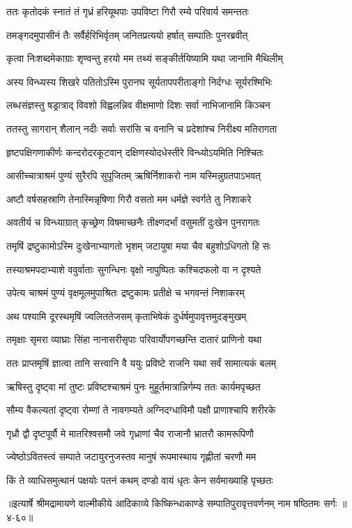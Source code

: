 
\twolineshloka
{ततः कृतोदकं स्नातं तं गृध्रं हरियूथपाः}
{उपविष्टा गिरौ रम्ये परिवार्य समन्ततः} %

\twolineshloka
{तमङ्गदमुपासीनं तैः सर्वैर्हरिभिर्वृतम्}
{जनितप्रत्ययो हर्षात् सम्पातिः पुनरब्रवीत्} %

\twolineshloka
{कृत्वा निःशब्दमेकाग्राः शृण्वन्तु हरयो मम}
{तथ्यं सङ्कीर्तयिष्यामि यथा जानामि मैथिलीम्} %

\twolineshloka
{अस्य विन्ध्यस्य शिखरे पतितोऽस्मि पुरानघ}
{सूर्यतापपरीताङ्गो निर्दग्धः सूर्यरश्मिभिः} %

\twolineshloka
{लब्धसंज्ञस्तु षड्रात्राद् विवशो विह्वलन्निव}
{वीक्षमाणो दिशः सर्वा नाभिजानामि किञ्चन} %

\twolineshloka
{ततस्तु सागरान् शैलान् नदीः सर्वाः सरांसि च}
{वनानि च प्रदेशांश्च निरीक्ष्य मतिरागता} %

\twolineshloka
{हृष्टपक्षिगणाकीर्णः कन्दरोदरकूटवान्}
{दक्षिणस्योदधेस्तीरे विन्ध्योऽयमिति निश्चितः} %

\twolineshloka
{आसीच्चात्राश्रमं पुण्यं सुरैरपि सुपूजितम्}
{ऋषिर्निशाकरो नाम यस्मिन्नुग्रतपाऽभवत्} %

\twolineshloka
{अष्टौ वर्षसहस्राणि तेनास्मिन्नृषिणा गिरौ}
{वसतो मम धर्मज्ञे स्वर्गते तु निशाकरे} %

\twolineshloka
{अवतीर्य च विन्ध्याग्रात् कृच्छ्रेण विषमाच्छनैः}
{तीक्ष्णदर्भां वसुमतीं दुःखेन पुनरागतः} %

\twolineshloka
{तमृषिं द्रष्टुकामोऽस्मि दुःखेनाभ्यागतो भृशम्}
{जटायुषा मया चैव बहुशोऽधिगतो हि सः} %

\twolineshloka
{तस्याश्रमपदाभ्याशे ववुर्वाताः सुगन्धिनः}
{वृक्षो नापुष्पितः कश्चिदफलो वा न दृश्यते} %

\twolineshloka
{उपेत्य चाश्रमं पुण्यं वृक्षमूलमुपाश्रितः}
{द्रष्टुकामः प्रतीक्षे च भगवन्तं निशाकरम्} %

\twolineshloka
{अथ पश्यामि दूरस्थमृषिं ज्वलिततेजसम्}
{कृताभिषेकं दुर्धर्षमुपावृत्तमुदङ्मुखम्} %

\twolineshloka
{तमृक्षाः सृमरा व्याघ्राः सिंहा नानासरीसृपाः}
{परिवार्योपगच्छन्ति दातारं प्राणिनो यथा} %

\twolineshloka
{ततः प्राप्तमृषिं ज्ञात्वा तानि सत्त्वानि वै ययुः}
{प्रविष्टे राजनि यथा सर्वं सामात्यकं बलम्} %

\twolineshloka
{ऋषिस्तु दृष्ट्वा मां तुष्टः प्रविष्टश्चाश्रमं पुनः}
{मुहूर्तमात्रान्निर्गम्य ततः कार्यमपृच्छत} %

\twolineshloka
{सौम्य वैकल्यतां दृष्ट्वा रोम्णां ते नावगम्यते}
{अग्निदग्धाविमौ पक्षौ प्राणाश्चापि शरीरके} %

\twolineshloka
{गृध्रौ द्वौ दृष्टपूर्वौ मे मातरिश्वसमौ जवे}
{गृध्राणां चैव राजानौ भ्रातरौ कामरूपिणौ} %

\twolineshloka
{ज्येष्ठोऽवितस्त्वं सम्पाते जटायुरनुजस्तव}
{मानुषं रूपमास्थाय गृह्णीतां चरणौ मम} %

\twolineshloka
{किं ते व्याधिसमुत्थानं पक्षयोः पतनं कथम्}
{दण्डो वायं धृतः केन सर्वमाख्याहि पृच्छतः} %


॥इत्यार्षे श्रीमद्रामायणे वाल्मीकीये आदिकाव्ये किष्किन्धाकाण्डे सम्पातिपुरावृत्तवर्णनम् नाम षष्ठितमः सर्गः ॥४-६०॥
